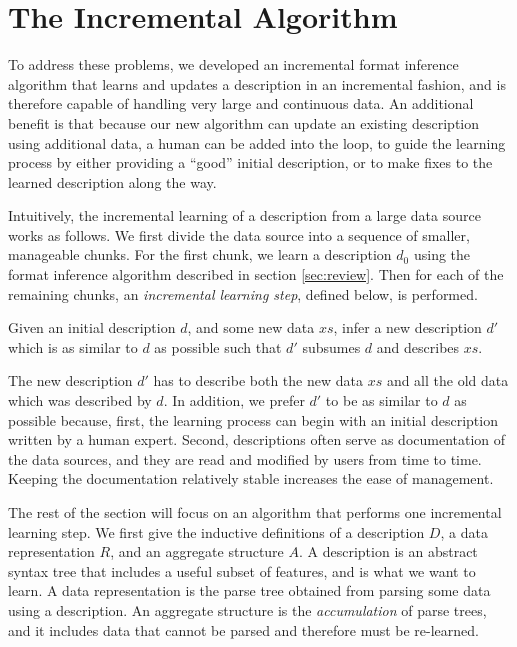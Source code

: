 \section{The Incremental Algorithm}
\label{sec:algo}
To address these problems, we developed an incremental format inference
algorithm that learns and updates a description in an incremental fashion, and
is therefore capable of handling very large and continuous data. An additional
benefit is that because our new algorithm can update an existing description
using additional data, a human can be added into the loop, to 
guide the learning process by either providing a ``good'' initial description, 
or to make fixes to the learned description along the way.


Intuitively, the incremental learning of a description from a large data source works
as follows. We first divide the data source into a sequence of smaller, manageable chunks.
For the first chunk, we learn a description $d_0$ using the format inference
algorithm described in section \ref{sec:review}. Then for each of the remaining chunks,
an {\em incremental learning step}, defined below, is performed.  

\begin{definition}
Given an initial description $d$, and some new data $xs$, infer a new description $d'$ 
which is as similar to $d$ as possible such that $d'$ subsumes $d$ and describes $xs$.
\end{definition}

The new description $d'$ has to describe both the new data $xs$ and
all the old data which was described by $d$. 
In addition, we prefer $d'$ to be as similar to $d$ as possible because, first,
the learning process can begin with an initial description 
written by a human expert. 
Second, descriptions often serve as documentation of the data sources, and they are
read and modified by users from time to time. Keeping the documentation relatively stable increases
the ease of management. 

The rest of the section will focus on an algorithm that
performs one incremental learning step.
We first give the inductive definitions of
a description $D$, a data representation $R$, and an aggregate structure $A$. 
A description is an abstract syntax tree that includes a useful subset
of \pads{} features, and is what we want to learn. A data representation is 
the parse tree obtained from parsing some data using a description. 
An aggregate structure is the {\em accumulation} of parse trees, and it
includes data that cannot be parsed and therefore must be re-learned.

